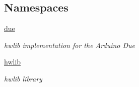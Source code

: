 \subsection*{Namespaces}
\begin{DoxyCompactItemize}
\item 
 \hyperlink{namespacedue}{due}
\begin{DoxyCompactList}\small\item\em hwlib implementation for the Arduino Due \end{DoxyCompactList}\item 
 \hyperlink{namespacehwlib}{hwlib}
\begin{DoxyCompactList}\small\item\em hwlib library \end{DoxyCompactList}\end{DoxyCompactItemize}

